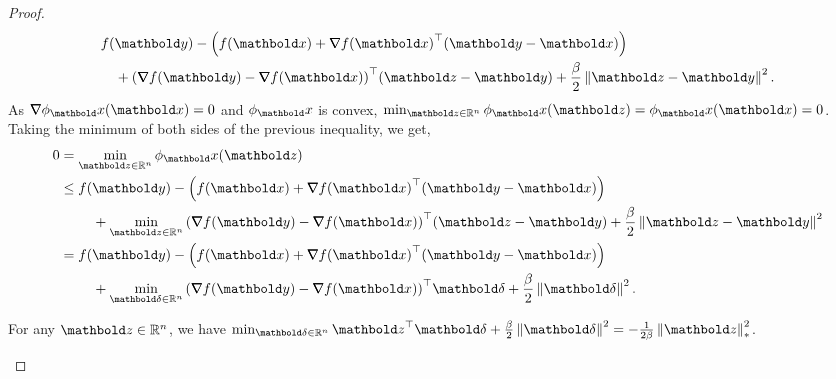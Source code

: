 \documentclass{tufte-handout}
\begin{document}
\begin{proof}
\begin{align*}
\begin{multlined}[t]
        f(\vy) - \parentheses*{f(\vx) + \trans{\grad f(\vx)}(\vy - \vx)} \\ + \trans{(\grad f(\vy) - \grad f(\vx))}(\vz - \vy) + \frac{\beta}{2} \norm{\vz - \vy}^2.
    \end{multlined}
\end{align*} As $\grad \phi_\vx(\vx) = 0$ and $\phi_\vx$ is convex, $\min_{\vz \in \R^n} \phi_\vx(\vz) = \phi_\vx(\vx) = 0$. Taking the minimum of both sides of the previous inequality, we get, \begin{align*}
    0 &= \min_{\vz\in\R^n} \phi_\vx(\vz) \\
    &\leq \begin{multlined}[t]
        f(\vy) - \parentheses*{f(\vx) + \trans{\grad f(\vx)}(\vy - \vx)} \\ + \min_{\vz\in\R^n} \trans{(\grad f(\vy) - \grad f(\vx))}(\vz - \vy) + \frac{\beta}{2} \norm{\vz - \vy}^2
    \end{multlined} \\
    &= \begin{multlined}[t]
        f(\vy) - \parentheses*{f(\vx) + \trans{\grad f(\vx)}(\vy - \vx)} \\ + \min_{\vdelta\in\R^n} \trans{(\grad f(\vy) - \grad f(\vx))}\vdelta + \frac{\beta}{2} \norm{\vdelta}^2.
    \end{multlined}
\end{align*}

\begin{clm}\label{clm:part:2f:1}
For any $\vz\in\R^n$, we have $\min_{\vdelta\in\R^n} \trans{\vz}\vdelta + \frac{\beta}{2}\norm{\vdelta}^2 = -\frac{1}{2\beta}\norm{\vz}_*^2$.
\end{clm}


\end{proof}
\end{document}
